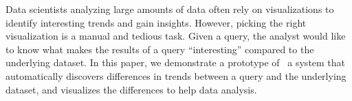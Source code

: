 % 
Data scientists analyzing large amounts of data often rely on visualizations to
identify interesting trends and gain insights. However, picking the right
visualization is a manual and tedious task. Given a query, the analyst would
like to know what makes the results of a query ``interesting'' compared to the
underlying dataset. In this paper, we demonstrate a prototype of \SeeDB\, a
system that automatically discovers differences in trends between a query and
the underlying dataset, and visualizes the differences to help data analysis.
